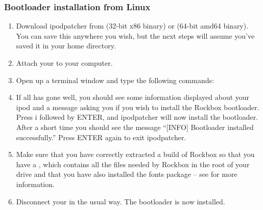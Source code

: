 \subsubsection{Bootloader installation from Linux}

\begin{enumerate}

\item Download ipodpatcher from
 (32-bit x86 
binary) or  
(64-bit amd64 binary). You can save this anywhere you wish, but the next 
steps will assume you've saved it in your home directory.

\item Attach your \dap{} to your computer.

\item Open up a terminal window and type the following commands:



\item If all has gone well, you should see some information displayed about
your ipod and a message asking you if you wish to install the Rockbox
bootloader. Press i followed by ENTER, and ipodpatcher will now install the
bootloader. After a short time you should see the message ``[INFO] Bootloader
installed successfully.'' Press ENTER again to exit ipodpatcher.

\item Make sure that you have correctly extracted a build of Rockbox so that
you have a , which contains all the files needed by Rockbox
in the root of your \daps{} drive and that you have also installed the fonts
package -- see  for more information.

\item Disconnect your \dap{} in the usual way. The bootloader is now installed.

\end{enumerate}
